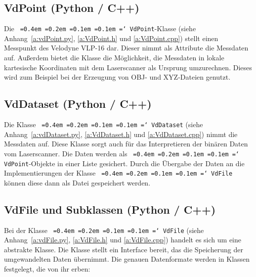 \documentclass[a4paper,12pt,bibliography=totoc, listof=totoc,titlepage,pointlessnumbers]{scrreprt}
\newcommand*\justify{%
  \fontdimen2\font=0.4em%
  \fontdimen3\font=0.2em%
  \fontdimen4\font=0.1em%
  \fontdimen7\font=0.1em%
  \hyphenchar\font=`\-%
}
\newcommand{\code}[1]{\texttt{\justify{#1}}}
\begin{document}
\subsection{VdPoint (Python / C++)}
Die \code{VdPoint}-Klasse (siehe Anhang~\ref{a:vdPoint.py}, \ref{a:VdPoint.h} und \ref{a:VdPoint.cpp}) stellt einen Messpunkt des Velodyne VLP-16 dar. Dieser nimmt als Attribute die Messdaten auf. Außerdem bietet die Klasse die Mög\-lich\-keit, die Messdaten in lokale kartesische Koordinaten mit dem Laser\-scan\-ner als Ursprung umzurechnen. Dieses wird zum Beispiel bei der Erzeugung von OBJ- und XYZ-Dateien genutzt.

\subsection{VdDataset (Python / C++)}
Die Klasse \code{VdDataset} (siehe Anhang~\ref{a:vdDataset.py}, \ref{a:VdDataset.h} und \ref{a:VdDataset.cpp}) nimmt die Messdaten auf. Diese Klasse sorgt auch für das Interpretieren der binären Daten vom Laser\-scan\-ner. Die Daten werden als \code{VdPoint}-Objekte in einer Liste gesichert. Durch die Übergabe der Daten an die Implementierungen der Klasse \code{VdFile} können diese dann als Datei gespeichert werden.

\subsection{VdFile und Subklassen (Python / C++)}
Bei der Klasse \code{VdFile} (siehe Anhang~\ref{a:vdFile.py}, \ref{a:VdFile.h} und \ref{a:VdFile.cpp}) handelt es sich um eine abstrakte Klasse. Die Klasse stellt ein Interface bereit, das die Speicherung der umgewandelten Daten übernimmt. Die genauen Datenformate werden in Klassen festgelegt, die von ihr erben:
\end{document}
